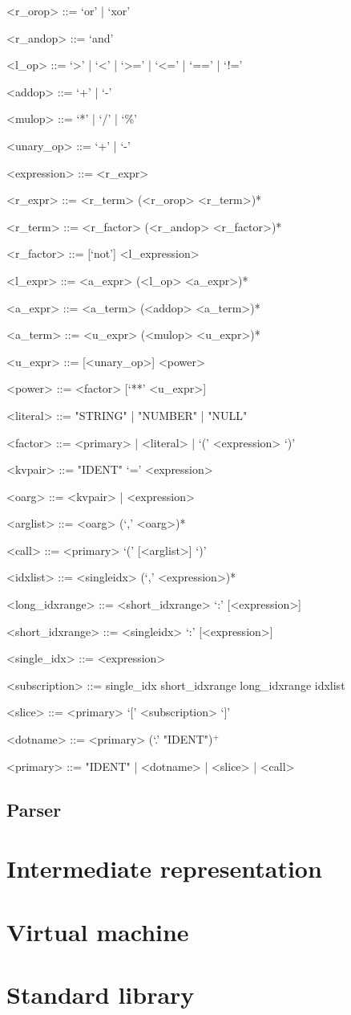 \documentclass[10pt,a4paper]{article}
\begin{document}
\begin{grammar}
<r_orop> ::= `or' | `xor'

<r_andop> ::= `and'

<l_op> ::= `>' | `<' | `>=' | `<=' | `==' | `!='

<addop> ::= `+' | `-'

<mulop> ::= `*' | `/' | `\%'

<unary_op> ::= `+' | `-'

<expression> ::= <r_expr>

<r_expr> ::= <r_term> (<r_orop> <r_term>)*

<r_term> ::= <r_factor> (<r_andop> <r_factor>)*

<r_factor> ::= [`not'] <l_expression>

<l_expr> ::= <a_expr> (<l_op> <a_expr>)*

<a_expr> ::= <a_term> (<addop> <a_term>)*

<a_term> ::= <u_expr> (<mulop> <u_expr>)*

<u_expr> ::= [<unary_op>] <power>

<power> ::= <factor> [`**' <u_expr>]

<literal> ::= "STRING" | "NUMBER" | "NULL"

<factor> ::= <primary> | <literal> | `(' <expression> `)'

<kvpair> ::= "IDENT" `=' <expression>

<oarg> ::= <kvpair> | <expression>

<arglist> ::= <oarg> (`,' <oarg>)*

<call> ::= <primary> `(' [<arglist>] `)'

<idxlist> ::= <singleidx> (`,' <expression>)*

<long_idxrange> ::= <short_idxrange> `:' [<expression>]

<short_idxrange> ::= <singleidx> `:' [<expression>] 

<single_idx> ::= <expression>

<subscription> ::= single_idx 
	\alt short_idxrange 
	\alt long_idxrange 
	\alt idxlist

<slice> ::= <primary> `[' <subscription> `]'

<dotname> ::= <primary> (`.' "IDENT")$^{+}$

<primary> ::= "IDENT" | <dotname> | <slice> | <call>

\end{grammar}

\subsection{Parser}

\pagebreak

\section{Intermediate representation}

\pagebreak

\section{Virtual machine}

\pagebreak

\section{Standard library}
\end{document}
